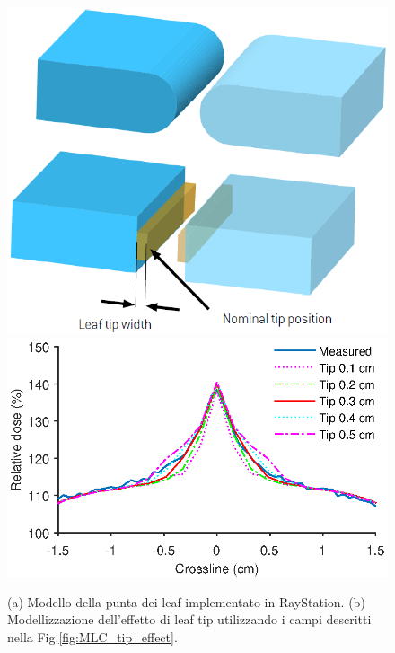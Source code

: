 \begin{figure}
\centering
\includegraphics[width=.5\textwidth]{./cap2/MLC_tip_model.png}
\includegraphics[width=.8\textwidth]{./cap2/MLC_Plots/Abutted/PlotMLC_Tip_modeling.eps}
\caption{(a) Modello della punta dei leaf implementato in RayStation. (b) Modellizzazione dell'effetto di leaf tip utilizzando i campi descritti nella Fig.\ref{fig:MLC_tip_effect}.}
\label{fig:MLC_tip_model}
\end{figure}

